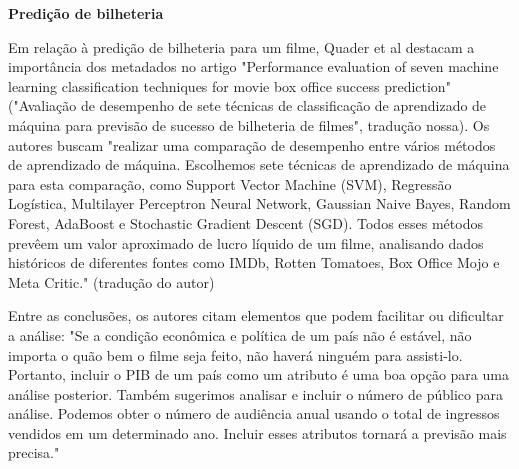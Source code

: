         \textbf{Predição de bilheteria}\par
        Em relação à predição de bilheteria para um filme, Quader et al destacam a importância dos metadados no artigo "Performance evaluation of seven machine learning classification techniques for movie box office success prediction" ("Avaliação de desempenho de sete técnicas de classificação de aprendizado de máquina para previsão de sucesso de bilheteria de filmes", tradução nossa). Os autores buscam "realizar uma comparação de desempenho entre vários métodos de aprendizado de máquina. Escolhemos sete técnicas de aprendizado de máquina para esta comparação, como Support Vector Machine (SVM), Regressão Logística, Multilayer Perceptron Neural Network, Gaussian Naive Bayes, Random Forest, AdaBoost e Stochastic Gradient Descent (SGD). Todos esses métodos prevêem um valor aproximado de lucro líquido de um filme, analisando dados históricos de diferentes fontes como IMDb, Rotten Tomatoes, Box Office Mojo e Meta Critic." \cite{quader2017} (tradução do autor)\par
        Entre as conclusões, os autores citam elementos que podem facilitar ou dificultar a análise: "Se a condição econômica e política de um país não é estável, não importa o quão bem o filme seja feito, não haverá ninguém para assisti-lo. Portanto, incluir o PIB de um país como um atributo é uma boa opção para uma análise posterior. Também sugerimos analisar e incluir o número de público para análise. Podemos obter o número de audiência anual usando o total de ingressos vendidos em um determinado ano. Incluir esses atributos tornará a previsão mais precisa."
    
    

